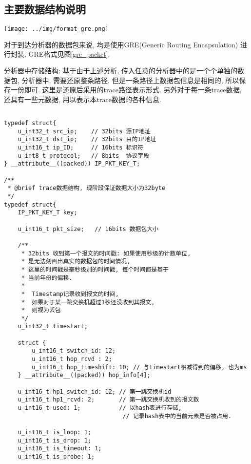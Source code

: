 {\begin{mdframed}[everyline=true]

\subsection{主要数据结构说明}

\begin{center}
\texttt{[image: ../img/format\_gre.png]}
\label{gre_packet}
\end{center}

对于到达分析器的数据包来说, 均是使用GRE(Generic Routing Encapsulation)
进行封装, GRE格式见图\ref{gre_packet}.

分析器中存储结构: 基于由于上述分析,
传入任意的分析器中的是一个个单独的数据包, 分析器中, 需要还原整条路径,
但是一条路径上数据包信息是相同的, 所以保存一份即可.
这里是还原后采用的trace路径表示形式.
另外对于每一条trace数据, 还具有一些元数据, 用以表示本trace数据的各种信息.


\begin{lstlisting}

typedef struct{
    u_int32_t src_ip;    // 32bits 源IP地址
    u_int32_t dst_ip;    // 32bits 目的IP地址
    u_int16_t ip_ID;     // 16bits 标识符
    u_int8_t protocol;   // 8bits  协议字段
} __attribute__((packed)) IP_PKT_KEY_T;

/**
 * @brief trace数据结构, 现阶段保证数据大小为32byte
 */
typedef struct{
    IP_PKT_KEY_T key;

    u_int16_t pkt_size;   // 16bits 数据包大小

    /**
     * 32bits 收到第一个报文的时间戳: 如果使用秒级的计数单位,
     * 是无法刻画出真实的数据包的时间情况,
     * 这里的时间戳是毫秒级别的时间戳, 每个时间都是基于
     * 当前年份的偏移.
     *
     *  Timestamp记录收到报文的时间,
     *  如果对于某一跳交换机超过1秒还没收到其报文,
     *  则视为丢包
     */
    u_int32_t timestart;

    struct {
        u_int16_t switch_id: 12;
        u_int16_t hop_rcvd : 2;
        u_int16_t hop_timeshift: 10; // 与timestart相减得到的偏移, 也为ms
    } __attribute__((packed)) hop_info[4];

    u_int16_t hp1_switch_id: 12; // 第一跳交换机id
    u_int16_t hp1_rcvd: 2;       // 第一跳交换机收到的报文数
    u_int16_t used: 1;           // 以hash表进行存储,
                                  // 记录hash表中的当前元素是否被占用.

    u_int16_t is_loop: 1;
    u_int16_t is_drop: 1;
    u_int16_t is_timeout: 1;
    u_int16_t is_probe: 1;


\end{lstlisting}
\end{mdframed}}
